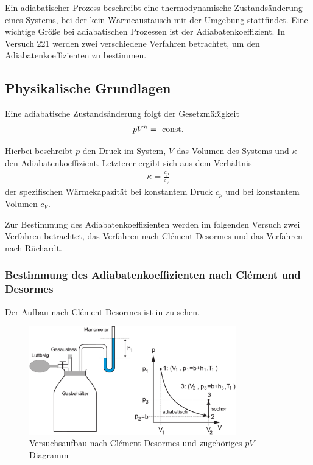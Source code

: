 Ein adiabatischer Prozess beschreibt eine thermodynamische Zustandsänderung eines Systems, bei der kein Wärmeaustausch mit der Umgebung stattfindet. Eine wichtige Größe bei adiabatischen Prozessen ist der Adiabatenkoeffizient. In Versuch 221 werden zwei verschiedene Verfahren betrachtet, um den Adiabatenkoeffizienten zu bestimmen.

\subsection{Physikalische Grundlagen}

Eine adiabatische Zustandsänderung folgt der Gesetzmäßigkeit
\begin{align}
  p V^{\kappa} = \text{ const.} \label{eq:adiabatisch}
\end{align}

Hierbei beschreibt $p$ den Druck im System, $V$ das Volumen des Systems und $\kappa$ den Adiabatenkoeffizient. Letzterer ergibt sich aus dem Verhältnis
\begin{align}
  \kappa = \frac{c_p}{c_V}
\end{align}
der spezifischen Wärmekapazität bei konstantem Druck $c_p$ und bei konstantem Volumen $c_V$.

Zur Bestimmung des Adiabatenkoeffizienten werden im folgenden Versuch zwei Verfahren betrachtet, das Verfahren nach Clément-Desormes und das Verfahren nach Rüchardt.

\subsubsection*{Bestimmung des Adiabatenkoeffizienten nach Clément und Desormes}

Der Aufbau nach Clément-Desormes ist in  zu sehen.

\begin{figure}[H]
  \centering
  \includegraphics[width=0.8\textwidth]{files/aufbau_clement_desormes.png}
  \caption{Versuchsaufbau nach Clément-Desormes und zugehöriges $pV$-Diagramm}
  \label{fig:aufbau_cd}
\end{figure}

